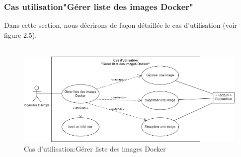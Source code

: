       \subsubsection{\Large Cas utilisation"Gérer liste des images Docker"}
       
      Dans cette section, nous décrirons de façon détaillée le cas d'utilisation (voir figure 2.5).\\\texttt{}\\[0.01cm]
      
      \begin{figure}[H]
        \begin{center}
        
            \includegraphics[width=15cm]{usecase5.drawio.png}
      
        \end{center}
        
        \caption{Cas d'utilisation:Gérer liste des images Docker}
      \end{figure}
      
